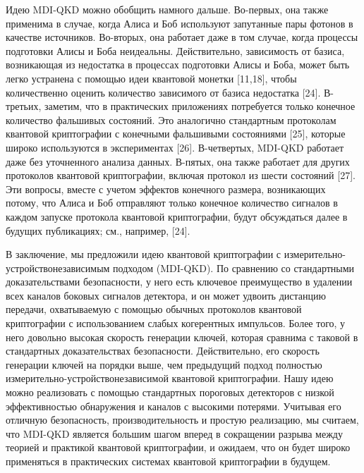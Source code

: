 Идею MDI-QKD можно обобщить намного дальше. Во-первых, она также применима в случае, когда Алиса и Боб используют запутанные пары фотонов в качестве источников. Во-вторых, она работает даже в том случае, когда процессы подготовки Алисы и Боба неидеальны. Действительно, зависимость от базиса, возникающая из недостатка в процессах подготовки Алисы и Боба, может быть легко устранена с помощью идеи квантовой монетки [11,18], чтобы количественно оценить количество зависимого от базиса недостатка [24]. В-третьих, заметим, что в практических приложениях потребуется только конечное количество фальшивых состояний. Это аналогично стандартным протоколам квантовой криптографии с конечными фальшивыми состояниями [25], которые широко используются в экспериментах [26]. В-четвертых, MDI-QKD работает даже без уточненного анализа данных. В-пятых, она также работает для других протоколов квантовой криптографии, включая протокол из шести состояний [27]. Эти вопросы, вместе с учетом эффектов конечного размера, возникающих потому, что Алиса и Боб отправляют только конечное количество сигналов в каждом запуске протокола квантовой криптографии, будут обсуждаться далее в будущих публикациях; см., например, [24].

В заключение, мы предложили идею квантовой криптографии с измерительно-устройствонезависимым подходом (MDI-QKD). По сравнению со стандартными доказательствами безопасности, у него есть ключевое преимущество в удалении всех каналов боковых сигналов детектора, и он может удвоить дистанцию передачи, охватываемую с помощью обычных протоколов квантовой криптографии с использованием слабых когерентных импульсов. Более того, у него довольно высокая скорость генерации ключей, которая сравнима с таковой в стандартных доказательствах безопасности. Действительно, его скорость генерации ключей на порядки выше, чем предыдущий подход полностью измерительно-устройствонезависимой квантовой криптографии. Нашу идею можно реализовать с помощью стандартных пороговых детекторов с низкой эффективностью обнаружения и каналов с высокими потерями. Учитывая его отличную безопасность, производительность и простую реализацию, мы считаем, что MDI-QKD является большим шагом вперед в сокращении разрыва между теорией и практикой квантовой криптографии, и ожидаем, что он будет широко применяться в практических системах квантовой криптографии в будущем.

